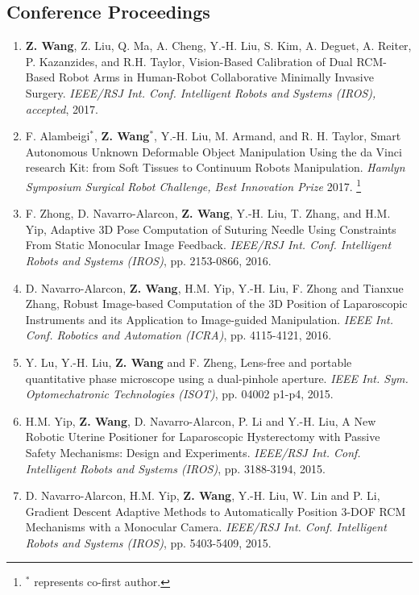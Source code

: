 \documentclass[10pt,letterpaper]{article}
\begin{document}
\subsection*{Conference Proceedings}
\begin{enumerate}
    \item \textbf{Z. Wang}, Z. Liu, Q. Ma, A. Cheng, Y.-H. Liu, S. Kim, A. Deguet, A. Reiter, P. Kazanzides, and R.H. Taylor,
    Vision-Based Calibration of Dual RCM-Based Robot Arms in Human-Robot Collaborative Minimally Invasive Surgery.
    \textit{{IEEE/RSJ} Int. Conf. Intelligent Robots and Systems (IROS), accepted}, 2017.
    \item F. Alambeigi$^*$, \textbf{Z. Wang}$^*$, Y.-H. Liu, M. Armand, and R. H. Taylor,
    Smart Autonomous Unknown Deformable Object Manipulation Using the da Vinci research Kit: from Soft Tissues to Continuum Robots Manipulation.
    \textit{Hamlyn Symposium Surgical Robot Challenge, Best Innovation Prize} 2017.
    \let\thefootnote\relax\footnote{$^*$ represents co-first author.}
    \item F. Zhong, D. Navarro-Alarcon, \textbf{Z. Wang}, Y.-H. Liu, T. Zhang, and H.M. Yip,
    Adaptive 3D Pose Computation of Suturing Needle Using Constraints From Static Monocular Image Feedback.
    \textit{{IEEE/RSJ} Int. Conf. Intelligent Robots and Systems (IROS)}, pp. 2153-0866, 2016.
    \item D. Navarro-Alarcon, \textbf{Z. Wang}, H.M. Yip, Y.-H. Liu, F. Zhong and Tianxue Zhang,
    Robust Image-based Computation of the 3D Position of Laparoscopic Instruments and its Application to Image-guided Manipulation.
    \textit{{IEEE} Int. Conf. Robotics and Automation (ICRA)}, pp. 4115-4121, 2016.
    \item Y. Lu, Y.-H. Liu, \textbf{Z. Wang} and F. Zheng,
    Lens-free and portable quantitative phase microscope using a dual-pinhole aperture.
    \textit{{IEEE} Int. Sym. Optomechatronic Technologies (ISOT)}, pp. 04002 p1-p4, 2015.
    \item H.M. Yip, \textbf{Z. Wang}, D. Navarro-Alarcon, P. Li and Y.-H. Liu,
    A New Robotic Uterine Positioner for Laparoscopic Hysterectomy with Passive Safety Mechanisms: Design and Experiments.
    \textit{{IEEE/RSJ} Int. Conf. Intelligent Robots and Systems (IROS)}, pp. 3188-3194, 2015.
    \item D. Navarro-Alarcon, H.M. Yip, \textbf{Z. Wang}, Y.-H. Liu, W. Lin and P. Li,
    Gradient Descent Adaptive Methods to Automatically Position 3-DOF RCM Mechanisms with a Monocular Camera.
    \textit{{IEEE/RSJ} Int. Conf. Intelligent Robots and Systems (IROS)}, pp. 5403-5409, 2015.

\end{enumerate}
\end{document}
